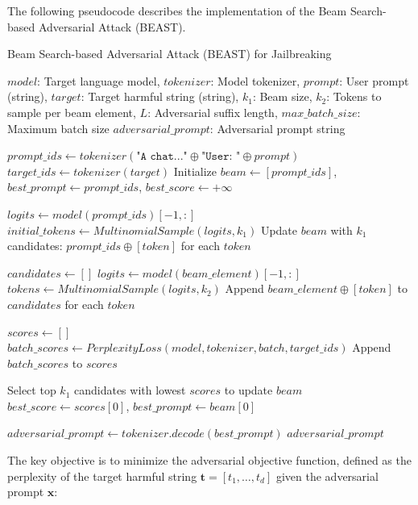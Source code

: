\documentclass[../main.tex]{subfiles}
\begin{document}
The following pseudocode describes the implementation of the Beam Search-based Adversarial Attack (BEAST).
\begin{breakablealgorithm}{Beam Search-based Adversarial Attack (BEAST) for Jailbreaking}
\begin{algorithmic}[1]
\Require $model$: Target language model, $tokenizer$: Model tokenizer, $prompt$: User prompt (string), $target$: Target harmful string (string), $k_1$: Beam size, $k_2$: Tokens to sample per beam element, $L$: Adversarial suffix length, $max\_batch\_size$: Maximum batch size
\Ensure $adversarial\_prompt$: Adversarial prompt string

\State $prompt\_ids \gets tokenizer(\texttt{"A chat..."} \oplus \texttt{"User: "} \oplus prompt)$
\State $target\_ids \gets tokenizer(target)$
\State Initialize $beam \gets [prompt\_ids]$, $best\_prompt \gets prompt\_ids$, $best\_score \gets +\infty$

\State $logits \gets model(prompt\_ids)[-1, :]$ 
\State $initial\_tokens \gets MultinomialSample(logits, k_1)$
\State Update $beam$ with $k_1$ candidates: $prompt\_ids \oplus [token]$ for each $token$

 
    \State $candidates \gets []$
        \State $logits \gets model(beam\_element)[-1, :]$
        \State $tokens \gets MultinomialSample(logits, k_2)$
        \State Append $beam\_element \oplus [token]$ to $candidates$ for each $token$
    \EndFor

    \State $scores \gets []$
     
        \State $batch\_scores \gets PerplexityLoss(model, tokenizer, batch, target\_ids)$
        \State Append $batch\_scores$ to $scores$
    \EndFor

    \State Select top $k_1$ candidates with lowest $scores$ to update $beam$
        \State $best\_score \gets scores[0]$, $best\_prompt \gets beam[0]$
    \EndIf
\EndFor

\State $adversarial\_prompt \gets tokenizer.decode(best\_prompt)$
\State \Return $adversarial\_prompt$
\end{algorithmic}
\end{breakablealgorithm}
The key objective is to minimize the adversarial objective function, defined as the perplexity of the target harmful string \(\mathbf{t} = [t_1, \ldots, t_d]\) given the adversarial prompt \(\mathbf{x}\):
\end{document}
